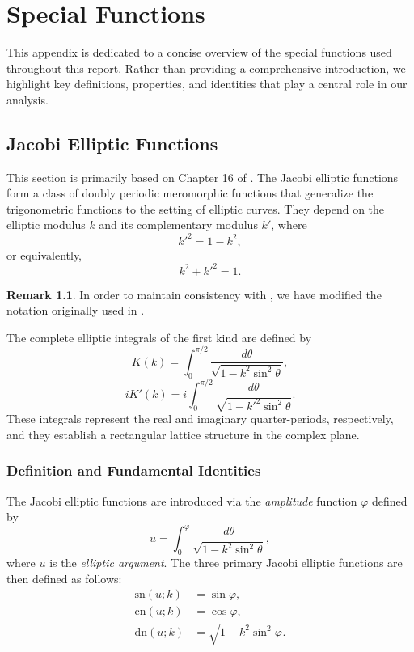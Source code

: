 \documentclass[12pt,oneside]{report}
\theoremstyle{definition}
\newtheorem{remark}{Remark}
\begin{document}
\chapter{Special Functions }\label{Elliptic functions}
This appendix is dedicated to a concise overview of the special functions used throughout this report. Rather than providing a comprehensive introduction, we highlight key definitions, properties, and identities that play a central role in our analysis.

\section{Jacobi Elliptic Functions}
This section is primarily based on Chapter 16 of \cite{abramowitz1968handbook}. The Jacobi elliptic functions form a class of doubly periodic meromorphic functions that generalize the trigonometric functions to the setting of elliptic curves. They depend on the elliptic modulus \(k\) and its complementary modulus \(k'\), where
\[
k'^2 = 1 - k^2,
\]
or equivalently,
\[
k^2 + k'^2 = 1.
\]

\begin{remark}
In order to maintain consistency with \cite{o2008integrable}, we have modified the notation originally used in \cite{abramowitz1968handbook}.
\end{remark}

The complete elliptic integrals of the first kind are defined by
\begin{equation}\label{eq:K}
K(k) = \int_0^{\pi/2} \frac{d\theta}{\sqrt{1 - k^2 \sin^2 \theta}},
\end{equation}
\begin{equation}\label{eq:Kprime}
iK'(k) = i\int_0^{\pi/2} \frac{d\theta}{\sqrt{1 - k'^2 \sin^2 \theta}}.
\end{equation}
These integrals represent the real and imaginary quarter-periods, respectively, and they establish a rectangular lattice structure in the complex plane.

\subsection{Definition and Fundamental Identities}
The Jacobi elliptic functions are introduced via the \textit{amplitude} function \(\varphi\) defined by
\begin{equation}\label{eq:amplitude}
u = \int_0^{\varphi} \frac{d\theta}{\sqrt{1 - k^2 \sin^2 \theta}},
\end{equation}
where \(u\) is the \textit{elliptic argument}. The three primary Jacobi elliptic functions are then defined as follows:
\begin{align}\label{Jacobi all functions}
\text{sn}(u;k) &= \sin\varphi,
\\
\text{cn}(u;k) &= \cos\varphi,
\\
\text{dn}(u;k) &= \sqrt{1 - k^2 \sin^2 \varphi}. 
\end{align}
\end{document}
